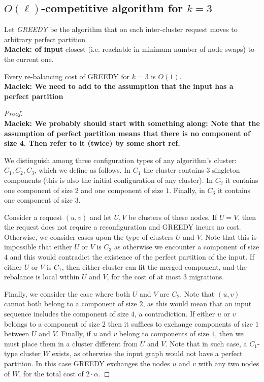 \documentclass[manuscript,screen=true]{acmart}
\newcommand\maciek[1]{\color{brown}\textbf{\\ Maciek: #1}\color{black}}
\begin{document}
\subsection{$O(\ell)$-competitive algorithm for $k=3$}

Let \emph{GREEDY} be the algorithm that on each inter-cluster request
 moves to arbitrary perfect partition \maciek{of input} closest (i.e. reachable in minimum number of node swaps) to the current one.


\begin{lemma} \label{lemma:k=3}
  Every re-balancing cost of GREEDY for $k=3$ is $O(1)$.
  \maciek{We need to add to the assumption that the input has a perfect partition}
  \label{rebalancing-cost}
\end{lemma}

\begin{proof} 

  \maciek{We probably should start with something along: Note that the assumption of perfect partition means that there is no component of size 4. Then refer to it (twice) by some short ref.}
  
  We distinguish among three configuration types of any algorithm's cluster: $C_1, C_2, C_3$, which we define as follows. In $C_1$ the cluster contains $3$ singleton components (this is also the initial configuration of any cluster). In $C_2$ it contains one component of size $2$ and one component of size $1$. Finally, in $C_3$ it contains one component of size $3$.

  Consider a request $(u, v)$ and let $U, V$ be clusters of these nodes.
  If $U=V$, then the request does not require a reconfiguration and GREEDY incurs no cost.
  Otherwise, we consider cases upon the type of clusters $U$ and $V$.
  Note that this is impossible that either $U$ or $V$ is $C_3$ as otherwise we encounter a component of size $4$ and this would contradict the existence of the perfect partition of the input.
  If either $U$ or $V$ is $C_1$, then either cluster can fit the merged component, and the rebalance is local within $U$ and $V$, for the cost of at most $3$ migrations.

  Finally, we consider the case where both $U$ and $V$ are $C_2$. Note that $(u,v)$ cannot both belong to a component of size $2$, as this would mean that an input sequence includes the component of size $4$, a contradiction. 
  If either $u$ or $v$ belongs to a component of size $2$ then it suffices to exchange components of size $1$ between $U$ and $V$.
  Finally, if $u$ and $v$ belong to components of size $1$, then we must place them in a cluster different from $U$ and $V$.
  Note that in such case, a $C_1$-type cluster $W$ exists, as otherwise the input graph would not have a perfect partition. In this case GREEDY exchanges the nodes $u$ and $v$ with any two nodes of $W$, for the total cost of $2\cdot \alpha$.
\end{proof}
\end{document}
